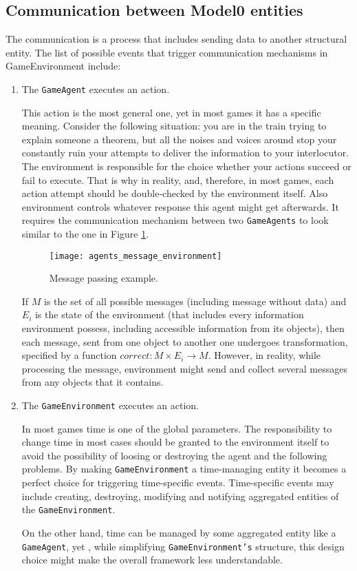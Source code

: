 \subsection{Communication between Model0 entities}
The communication is a process that includes sending data to another structural entity.
The list of possible events that trigger communication mechanisms in GameEnvironment include:
\begin{enumerate}
\item The \texttt{GameAgent} executes an action.\par
This action is the most general one, yet in most games it has a specific meaning. Consider the following situation: you are in the train trying to explain someone a theorem, but all the noises and voices around stop your constantly ruin your attempts to deliver the information to your interlocutor. The environment is responsible for the choice whether your actions succeed or fail to execute. That is why in reality, and, therefore, in most games, each action attempt should be double-checked by the environment itself. Also environment controls whatever response this agent might get afterwards. It requires the communication mechanism between two \texttt{GameAgents} to look similar to the one in Figure \ref{MessagePass}.
 \begin{figure}[h!]
    \begin{center}
      \texttt{[image: agents\_message\_environment]}
      \caption{Message passing example.}
      \label{MessagePass}
     \end{center}
    \end{figure}
If $M$ is the set of all possible messages (including message without data) and $E_i$ is the state of the environment (that includes every information environment possess, including accessible information from its objects), then each message, sent from one object to another one undergoes transformation, specified by a function \(correct: M\times E_i \rightarrow M\).
However, in reality, while processing the message, environment might send and collect several messages from any objects that it contains.
\item The \texttt{GameEnvironment} executes an action.\par
In most games time is one of the global parameters. The responsibility to change time in most cases should be granted to the environment itself to avoid the possibility of loosing or destroying the agent and the following problems. By making \texttt{GameEnvironment} a time-managing entity it becomes a perfect choice for triggering time-specific events. Time-specific events may include creating, destroying, modifying and notifying aggregated entities of the \texttt{GameEnvironment}.

On the other hand, time can be managed by some aggregated entity like a \texttt{GameAgent}, yet , while simplifying \texttt{GameEnvironment's} structure, this design choice might make the overall framework less understandable.
\end{enumerate}

